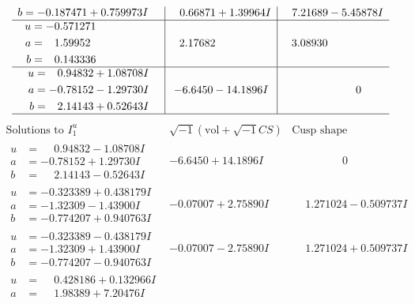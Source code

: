 \documentclass[1p]{elsarticle_modified}
\theoremstyle{definition}
\newcommand{\I}{\sqrt{-1}}
\begin{document}
$$\begin{array}{c|c|c}
\begin{aligned}
b &= -0.187471 + 0.759973 I\end{aligned}
 & \phantom{-}0.66871 + 1.39964 I & \phantom{-}7.21689 - 5.45878 I \\ \hline\begin{aligned}
u &= -0.571271\phantom{ +0.000000I} \\
a &= \phantom{-}1.59952\phantom{ +0.000000I} \\
b &= \phantom{-}0.143336\phantom{ +0.000000I}\end{aligned}
 & \phantom{-}2.17682\phantom{ +0.000000I} & \phantom{-}3.08930\phantom{ +0.000000I} \\ \hline\begin{aligned}
u &= \phantom{-}0.94832 + 1.08708 I \\
a &= -0.78152 - 1.29730 I \\
b &= \phantom{-}2.14143 + 0.52643 I\end{aligned}
 & -6.6450 - 14.1896 I & \phantom{-0.000000 } 0\\
 \hline 
 \end{array}$$\newpage$$\begin{array}{c|c|c}  
\text{Solutions to }I^u_{1}& \I (\text{vol} + \sqrt{-1}CS) & \text{Cusp shape}\\
 \hline 
\begin{aligned}
u &= \phantom{-}0.94832 - 1.08708 I \\
a &= -0.78152 + 1.29730 I \\
b &= \phantom{-}2.14143 - 0.52643 I\end{aligned}
 & -6.6450 + 14.1896 I & \phantom{-0.000000 } 0 \\ \hline\begin{aligned}
u &= -0.323389 + 0.438179 I \\
a &= -1.32309 - 1.43900 I \\
b &= -0.774207 + 0.940763 I\end{aligned}
 & -0.07007 + 2.75890 I & \phantom{-}1.271024 - 0.509737 I \\ \hline\begin{aligned}
u &= -0.323389 - 0.438179 I \\
a &= -1.32309 + 1.43900 I \\
b &= -0.774207 - 0.940763 I\end{aligned}
 & -0.07007 - 2.75890 I & \phantom{-}1.271024 + 0.509737 I \\ \hline\begin{aligned}
u &= \phantom{-}0.428186 + 0.132966 I \\
a &= \phantom{-}1.98389 + 7.20476 I \\

\end{aligned}
\end{array}$$
\end{document}
